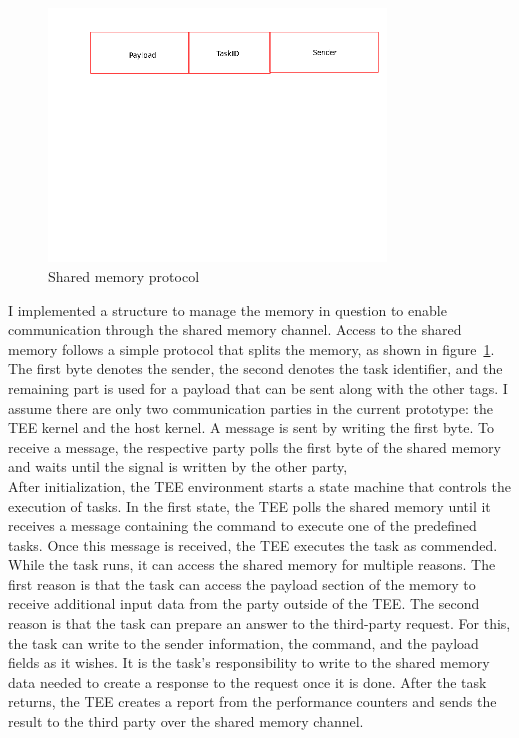 \begin{center}
    \begin{figure}
        \includegraphics[width=0.8\textwidth]{images/shared_mem_placeholder.png}
        \caption{Shared memory protocol}
        \label{fig:shared-mem}
    \end{figure}
\end{center}

I implemented a structure to manage the memory in question to enable
communication through the shared memory channel. Access to the shared memory
follows a simple protocol that splits the memory, as shown in
figure~\ref{fig:shared-mem}. The first byte denotes the sender, the second
denotes the task identifier, and the remaining part is used for a payload that
can be sent along with the other tags. I assume there are only two communication
parties in the current prototype: the TEE kernel and the host kernel. A message
is sent by writing the first byte. To receive a message, the respective party
polls the first byte of the shared memory and waits until the signal is written
by the other party, \\

After initialization, the TEE environment starts a state machine that controls
the execution of tasks. In the first state, the TEE polls the shared memory
until it receives a message containing the command to execute one of the
predefined tasks. Once this message is received, the TEE executes the task as
commended. While the task runs, it can access the shared memory for multiple
reasons. The first reason is that the task can access the payload section of the
memory to receive additional input data from the party outside of the TEE. The
second reason is that the task can prepare an answer to the third-party request.
For this, the task can write to the sender information, the command, and the
payload fields as it wishes. It is the task's responsibility to write to the
shared memory data needed to create a response to the request once it is done.
After the task returns, the TEE creates a report from the performance counters
and sends the result to the third party over the shared memory
channel. \\

